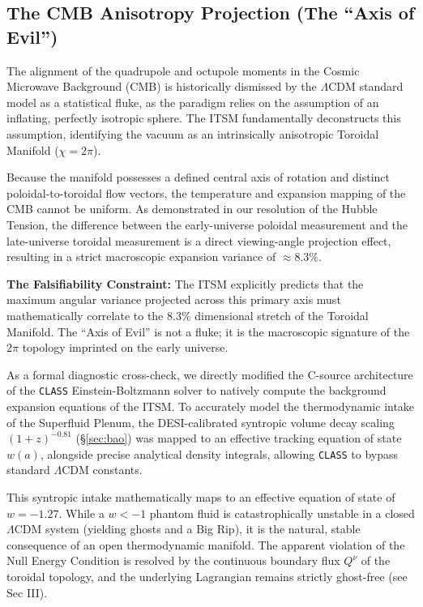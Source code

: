 \documentclass[aps,prd,10pt,twocolumn,superscriptaddress,nofootinbib,floatfix]{revtex4-2}
\begin{document}
\subsection{The CMB Anisotropy Projection (The ``Axis of Evil'')}
The alignment of the quadrupole and octupole moments in the Cosmic Microwave Background (CMB) \cite{axis_of_evil} is historically dismissed by the $\Lambda$CDM standard model as a statistical fluke, as the paradigm relies on the assumption of an inflating, perfectly isotropic sphere. The ITSM fundamentally deconstructs this assumption, identifying the vacuum as an intrinsically anisotropic Toroidal Manifold ($\chi=2\pi$).

Because the manifold possesses a defined central axis of rotation and distinct poloidal-to-toroidal flow vectors, the temperature and expansion mapping of the CMB cannot be uniform. As demonstrated in our resolution of the Hubble Tension, the difference between the early-universe poloidal measurement and the late-universe toroidal measurement is a direct viewing-angle projection effect, resulting in a strict macroscopic expansion variance of $\approx 8.3\%$.

\textbf{The Falsifiability Constraint:} The ITSM explicitly predicts that the maximum angular variance projected across this primary axis must mathematically correlate to the 8.3\% dimensional stretch of the Toroidal Manifold. The ``Axis of Evil'' is not a fluke; it is the macroscopic signature of the $2\pi$ topology imprinted on the early universe.

As a formal diagnostic cross-check, we directly modified the C-source architecture of the \texttt{CLASS} Einstein-Boltzmann solver \cite{class_code} to natively compute the background expansion equations of the ITSM. To accurately model the thermodynamic intake of the Superfluid Plenum, the DESI-calibrated syntropic volume decay scaling $(1+z)^{-0.81}$ (\S\ref{sec:bao}) was mapped to an effective tracking equation of state $w(a)$, alongside precise analytical density integrals, allowing \texttt{CLASS} to bypass standard $\Lambda$CDM constants.

This syntropic intake mathematically maps to an effective equation of state of $w = -1.27$. While a $w < -1$ phantom fluid is catastrophically unstable in a closed $\Lambda$CDM system (yielding ghosts and a Big Rip), it is the natural, stable consequence of an open thermodynamic manifold. The apparent violation of the Null Energy Condition is resolved by the continuous boundary flux $Q^\nu$ of the toroidal topology, and the underlying Lagrangian remains strictly ghost-free (see Sec III).
\end{document}
